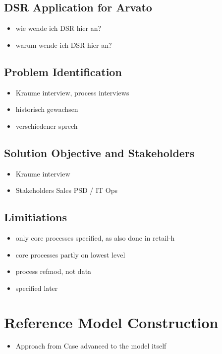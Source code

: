 \section{DSR Application for Arvato}
\begin{itemize}
	\item wie wende ich DSR hier an?
	\item warum wende ich DSR hier an?
	
\end{itemize}
\section{Problem Identification}
\begin{itemize}
	\item Kraume interview, process interviews
	\item historisch gewachsen
	\item verschiedener sprech
	
\end{itemize}
\section{Solution Objective and Stakeholders}
\begin{itemize}
	\item Kraume interview
	\item Stakeholders
	\subitem Sales
	\subitem PSD / IT
	\subitem Ops
\end{itemize}
\section{Limitiations}
\begin{itemize}
	\item only core processes specified, as also done in retail-h
	\item core processes partly on lowest level
	\item process refmod, not data
	\item specified later
\end{itemize}

\chapter{Reference Model Construction}
\begin{itemize}
	\item Approach from Case advanced to the model itself
	
\end{itemize}
